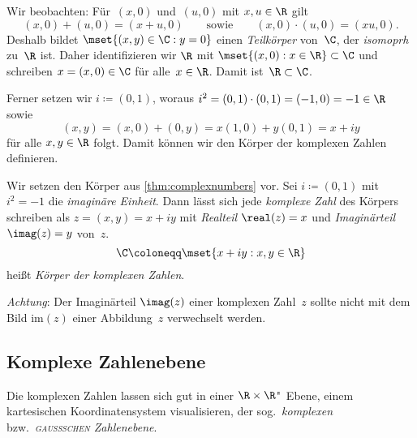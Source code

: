 \documentclass[a4paper]{article}
\begin{document}
Wir beobachten: Für~$(x, 0)$ und~$(u, 0)$ mit $x,u \in \R$ gilt
\begin{equation*}
    (x, 0) + (u, 0) = (x+u, 0) \qquad\text{sowie}\qquad (x, 0) \cdot (u, 0) = (xu, 0).
\end{equation*}
Deshalb bildet $\mset{(x,y) \in \C : y = 0}$ einen \emph{Teilkörper} von~$\C$, der \emph{isomoprh} zu~$\R$ ist. Daher identifizieren wir $\R$ mit $\mset{(x, 0) : x \in \R} \subset \C$ und schreiben $x = (x, 0) \in \C$ für alle~$x \in \R$. Damit ist~$\R \subset \C$.

Ferner setzen wir $i \coloneqq (0, 1)$, woraus $i^2 = (0, 1)\cdot(0, 1) = (-1, 0) = -1 \in \R$ sowie
\begin{equation*}
    (x,y) = (x, 0)+(0,y) = x(1, 0)+y(0, 1) = x+iy
\end{equation*}
für alle $x,y \in \R$ folgt. Damit können wir den Körper der komplexen Zahlen definieren.

\begin{definition}
    Wir setzen den Körper aus \cref{thm:complexnumbers} vor. Sei $i \coloneqq (0, 1)$ mit~$i^2 = -1$ die \emph{imaginäre Einheit}. Dann lässt sich jede \emph{komplexe Zahl} des Körpers schreiben als $z = (x,y) = x+iy$ mit \emph{Realteil} $\real(z) = x$ und \emph{Imaginärteil} $\imag(z) = y$ von~$z$.
    \begin{equation*}
        \C \coloneqq \mset{x+iy : x,y \in \R}
    \end{equation*}
    heißt \emph{Körper der komplexen Zahlen}.
\end{definition}

\emph{Achtung}: Der Imaginärteil $\imag(z)$ einer komplexen Zahl~$z$ sollte nicht mit dem Bild $\mathrm{im}(z)$ einer Abbildung~$z$ verwechselt werden.

\subsection{Komplexe Zahlenebene}

Die komplexen Zahlen lassen sich gut in einer $\R\times\R$"~Ebene, einem kartesischen Koordinatensystem visualisieren, der sog.\ \emph{komplexen} bzw.\ \emph{\textsc{gaußschen} Zahlenebene}.
\end{document}
